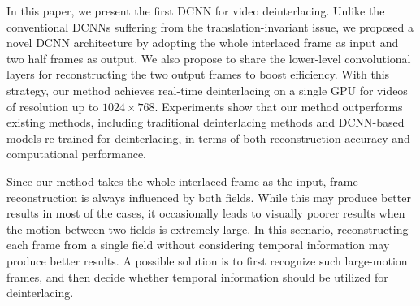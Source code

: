 In this paper, we present the first DCNN for video deinterlacing. Unlike
the conventional DCNNs suffering from the translation-invariant issue, we
proposed a novel DCNN architecture by adopting the whole interlaced frame as
input and two half frames as output. We also propose to share the lower-level
convolutional layers for reconstructing the two output frames to boost  
efficiency. With this strategy, our method achieves real-time deinterlacing
on a single GPU for videos of resolution up to $1024\times768$.
Experiments show that our method outperforms existing methods,
including traditional deinterlacing methods and DCNN-based models re-trained for
deinterlacing, in terms of both reconstruction accuracy and computational
performance.

Since our method takes the whole interlaced frame as the input, frame
reconstruction is always influenced by both fields. While this may produce
better results in most of the cases, it occasionally leads to visually poorer
results when the
motion between two fields is extremely large. In this scenario, reconstructing
each frame from a single field without considering temporal information may
produce better results. A possible solution is to first recognize such large-motion
frames, and then decide whether temporal information should be utilized for 
deinterlacing.

